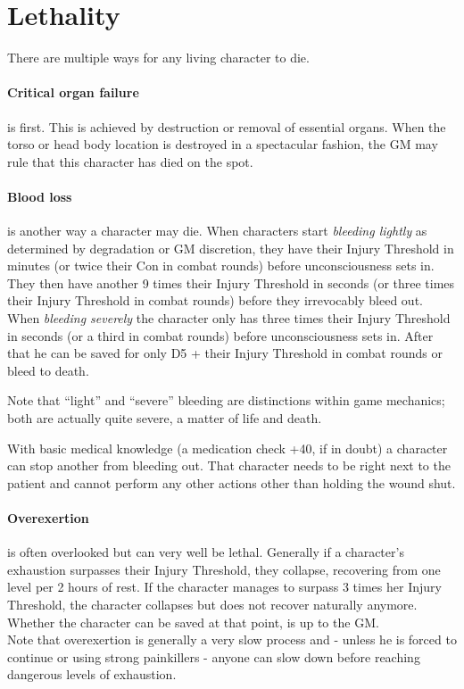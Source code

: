 \documentclass[12pt,a4paper,openany,dvipsnames]{book}
\begin{document}
	\section{Lethality}
	\label{sec:lethality}
	There are multiple ways for any living character to die.
	\paragraph{Critical organ failure}is first. This is achieved by destruction or removal of essential organs. When the torso or head body location is destroyed in a spectacular fashion, the GM may rule that this character has died on the spot.
	\paragraph{Blood loss}is another way a character may die. When characters start \emph{bleeding lightly} as determined by degradation or GM discretion, they have their Injury Threshold in minutes (or twice their Con in combat rounds) before unconsciousness sets in.
	They then have another 9 times their Injury Threshold in seconds (or three times their Injury Threshold in combat rounds) before they irrevocably bleed out.
    When \emph{bleeding severely} the character only has three times their Injury Threshold in seconds (or a third in combat rounds) before unconsciousness sets in.
	After that he can be saved for only D5 + their Injury Threshold in combat rounds or bleed to death.
	\begin{exampleblock}
		Note that “light” and “severe” bleeding are distinctions within game mechanics;
		both are actually quite severe, a matter of life and death.
	\end{exampleblock}
	With basic medical knowledge (a medication check +40, if in doubt) a character can stop another from bleeding out. That character needs to be right next to the patient and cannot perform any other actions other than holding the wound shut.
	\paragraph{Overexertion} is often overlooked but can very well be lethal. Generally if a character’s exhaustion surpasses their Injury Threshold, they collapse, recovering from one level per 2 hours of rest.
    If the character manages to surpass 3 times her Injury Threshold, the character collapses but does not recover naturally anymore.
    Whether the character can be saved at that point, is up to the GM.\\
	Note that overexertion is generally a very slow process
		and - unless he is forced to continue or using strong painkillers -
		anyone can slow down before reaching dangerous levels of exhaustion.
\end{document}
